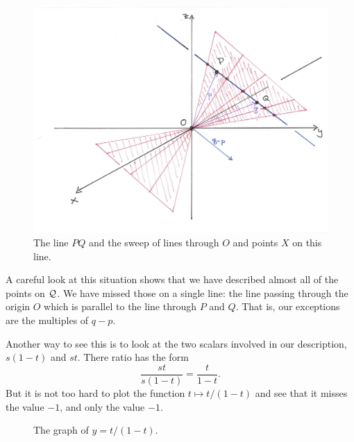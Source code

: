 \documentclass[00-livre-main.tex]{subfiles}
\begin{document}
\begin{figure}[ht]
\centering
\includegraphics[width=\textwidth]{images/plane-sweep.png}
\caption{The line $PQ$ and the sweep of lines through $O$ and points $X$ on this line.}
\label{fig:parametric-plane-O}
\end{figure}

A careful look at this situation shows that we have described almost all of the points on $\mathcal{Q}$. We have missed those on a single line: the line passing through the origin $O$ which is parallel to the line through $P$ and $Q$. That is, our exceptions are the multiples of $q-p$. 

Another way to see this is to look at the two scalars involved in our description, $s(1-t)$ and $st$. There ratio has the form
\[
\frac{st}{s(1-t)} = \frac{t}{1-t}.
\]
But it is not too hard to plot the function $t\mapsto t/(1-t)$ and see that it misses the value $-1$, and only the value $-1$. 


\begin{figure}[h]
\centering
{}
\caption{The graph of $y= t/(1-t)$.}
\label{fig:graph-ratio}
\end{figure}
\end{document}
